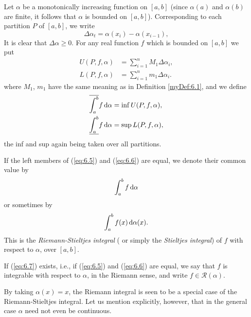 \begin{myDef}
    \label{myDef:6.2}
    Let $\alpha$ be a monotonically increasing function on $[a, b]$ 
    (since $\alpha (a)$ and $\alpha (b)$ are finite, 
    it follows that $\alpha$ is bounded on $[a, b]$). 
    Corresponding to each partition $P$ of $[a, b]$, 
    we write
    \begin{equation*}
        \Delta \alpha_t = \alpha (x_{i}) - \alpha (x_{i-1}),        
    \end{equation*}
    It is clear that $\Delta \alpha \geq 0$. 
    For any real function $f$ which is bounded on $[a, b]$
    we put
    \begin{align*}
        U(P, f, \alpha) &= \sum_{i=1}^{n} M_1 \Delta \alpha_i, \\
        L(P, f, \alpha) &= \sum_{i=1}^{n} m_1 \Delta \alpha_i. 
    \end{align*}
    where $M_1$, $m_1$ have the same meaning as in Definition \ref{myDef:6.1}, 
    and we define
    \begin{align}
        \label{eq:6.5}
        \overline{\int_{a}^{b}} f \d \alpha &= \inf U(P, f, \alpha), \\
        \label{eq:6.6}
        \underline{\int_{a}^{b}} f \d \alpha &= \sup L(P, f, \alpha),
    \end{align}
    the inf and sup again being taken over all partitions.

    If the left members of (\ref{eq:6.5}) and (\ref{eq:6.6}) are equal, 
    we denote their common value by
    \begin{equation}
        \label{eq:6.7}
        \int_{a}^{b} f \d \alpha
    \end{equation}
    or sometimes by 
    \begin{equation}
        \label{eq:6.8}
        \int_{a}^{b} f(x) \d \alpha (x).
    \end{equation}
    This is the \emph{Riemann-Stieltjes integral} 
    ( or simply the \emph{Stieltjes integral}) of $f$ 
    with respect to $\alpha$, over $[a, b]$.

    If (\ref{eq:6.7}) exists, i.e., 
    if (\ref{eq:6.5}) and (\ref{eq:6.6}) are equal, 
    we say that $f$ is integrable with respect to $\alpha$, 
    in the Riemann sense, and write $f \in \mathscr{R}(\alpha)$.
    
    By taking $\alpha(x) = x$, 
    the Riemann integral is seen to be a special case of
    the Riemann-Stieltjes integral. 
    Let us mention explicitly, however, that in the
    general case $\alpha$ need not even be continuous.


\end{myDef}
